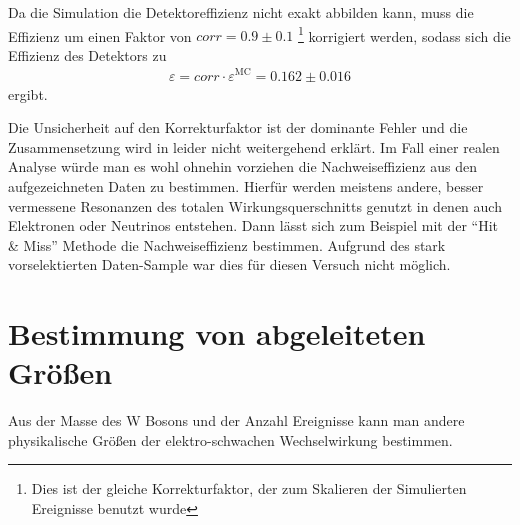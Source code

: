\documentclass[a4paper,12pt]{article}
\begin{document}
Da die Simulation die Detektoreffizienz nicht exakt abbilden kann, muss die Effizienz um einen
Faktor von $corr = 0.9±0.1$
\footnote{Dies ist der gleiche Korrekturfaktor, der zum Skalieren der Simulierten Ereignisse benutzt
wurde}
korrigiert werden, sodass sich die Effizienz des Detektors zu
\begin{align*}
	ε = corr \cdot ε^\text{MC} = 0.162±0.016
\end{align*}
ergibt.

Die Unsicherheit auf den Korrekturfaktor ist der dominante Fehler und die Zusammensetzung wird in \cite{versuchsanleitung} leider nicht weitergehend erklärt. Im Fall einer realen Analyse würde man es wohl ohnehin vorziehen die Nachweiseffizienz aus
den aufgezeichneten Daten zu bestimmen. Hierfür werden meistens andere, besser vermessene Resonanzen des totalen Wirkungsquerschnitts genutzt
in denen auch Elektronen oder Neutrinos entstehen. Dann lässt sich zum Beispiel mit der "`Hit \&
Miss"' Methode die Nachweiseffizienz bestimmen. Aufgrund
des stark vorselektierten Daten-Sample war dies für diesen Versuch nicht möglich.

\newpage
\section{Bestimmung von abgeleiteten Größen}
Aus der Masse des W Bosons und der Anzahl Ereignisse kann man andere physikalische Größen
der elektro-schwachen Wechselwirkung bestimmen.
\end{document}
